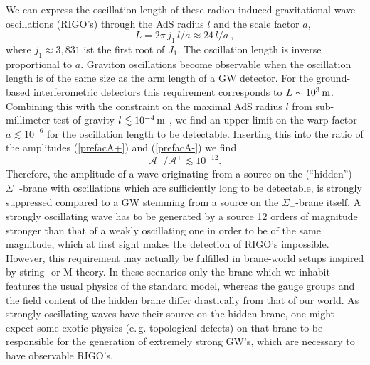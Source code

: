 \documentclass[a4paper,prl,twocolumn,amsmath,amssymb,showpacs]{revtex4}
\begin{document}
We can express the oscillation length of 
these radion-induced gravitational wave oscillations (RIGO's) through the AdS 
radius $l$ and the scale factor $a$, 
\begin{equation} 
L = 2 \pi \, j_1 \, l/a
\approx 24\, l/a\ , 
\end{equation}
where $j_1 \approx 3,831$ ist the first root of $J_1$.
The oscillation length is inverse proportional to $a$. Graviton oscillations 
become observable when the oscillation length is of the same size as the 
arm length of a GW detector. For the ground-based interferometric detectors this 
requirement corresponds to $L \sim 10^3\,{\rm m}$.  Combining this with the 
constraint on the maximal AdS radius $l$ from sub-millimeter test 
of gravity $l 
\lesssim 10^{-4}\,{\rm m}$ \cite{Gundlach}, we find an upper limit on the warp 
factor $a \lesssim 10^{-6}$ for the oscillation length to be detectable. 
Inserting this into the ratio of the amplitudes (\ref{prefacA+}) and
(\ref{prefacA-}) we find 
\begin{equation} 
\mathcal{A}^- / \mathcal{A}^+  \lesssim 10^{-12}. 
\end{equation} 
Therefore, the amplitude of a wave originating from a source on the
(``hidden'') $\Sigma_-$-brane with oscillations which are sufficiently long
to be detectable, is strongly suppressed compared to a GW stemming from a
source on the $\Sigma_+$-brane itself.  A strongly oscillating wave has to be
generated by a source 12 orders of magnitude stronger than that of a weakly
oscillating one in order to be of the same magnitude, which at first sight
makes the detection of RIGO's impossible. However, this requirement may
actually be fulfilled in brane-world setups inspired by string- or M-theory.
In these scenarios only the brane which we inhabit features the usual physics
of the standard model, whereas the gauge groups and the field content of the
hidden brane differ drastically from that of our world. As strongly
oscillating waves have their source on the hidden brane, one might expect some
exotic physics (e.\,g. topological defects) on that brane to be responsible
for the generation of extremely strong GW's, which are necessary to have
observable RIGO's.
 
\end{document}
